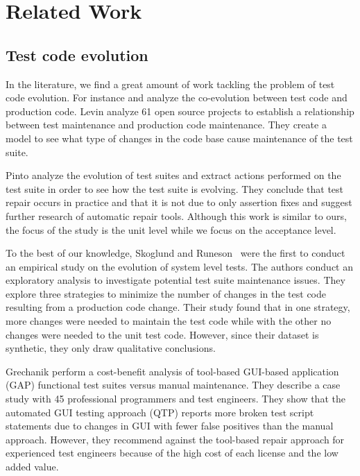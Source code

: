 \chapter{Related Work}
\label{related}

\section{Test code evolution}
\label{related-evolution}

In the literature, we find a great amount of work tackling the problem of test code evolution. For instance \cite{Zaidman2011} and \cite{Levin2017} analyze the co-evolution between test code and production code. Levin\etal\cite{Levin2017} analyze 61 open source projects to establish a relationship between test maintenance and production code maintenance. They create a model to see what type of changes in the code base cause maintenance of the test suite.

Pinto\etal\cite{Pinto2012} analyze the evolution of test suites and extract actions performed on the test suite in order to see how the test suite is evolving. They conclude that test repair occurs in practice and that it is not due to only assertion fixes and suggest further research of automatic repair tools. Although this work is similar to ours, the focus of the study is the unit level while we focus on the acceptance level.

To the best of our knowledge, Skoglund and Runeson~\cite{Skoglund2004} were the first to conduct an empirical study on the evolution of system level tests. The authors conduct an exploratory analysis to investigate potential test suite maintenance issues. They explore three strategies to minimize the number of changes in the test code resulting from a production code change. Their study found that in one strategy, more changes were needed to maintain the test code while with the other no changes were needed to the unit test code. However, since their dataset is synthetic, they only draw qualitative conclusions.

Grechanik\etal\cite{Grechanik2009} perform a cost-benefit analysis of tool-based GUI-based application (GAP) functional test suites versus manual maintenance. They describe a case study with 45 professional programmers and test engineers. They show that the automated GUI testing approach (QTP) reports more broken test script statements due to changes in GUI with fewer false positives than the manual approach. However, they recommend against the tool-based repair approach for experienced test engineers because of the high cost of each license and the low added value.

